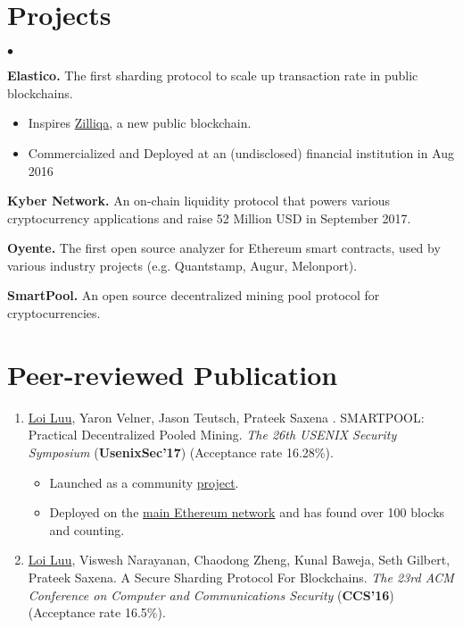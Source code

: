 \documentclass[margin,line]{res}
\newenvironment{list0}{
  \begin{list}{$\bullet$}{%
      \setlength{\itemsep}{0.08in}
      \setlength{\parsep}{0in} \setlength{\parskip}{0in}
      \setlength{\topsep}{0in} \setlength{\partopsep}{0in} 
      \setlength{\leftmargin}{0.0in}}}{\end{list}}
\begin{document}
\begin{resume}
\section{\sc Projects}
\begin{list0}
\item {\bf Elastico.} The first sharding protocol to scale up transaction rate in public blockchains.
  \begin{itemize}
    \item Inspires \href{https://zilliqa.com}{Zilliqa}, a new public blockchain.
    \item Commercialized and Deployed at an (undisclosed) financial institution in Aug 2016
  \end{itemize}

\item {\bf Kyber Network.} An on-chain liquidity protocol that powers various cryptocurrency applications and raise 52 Million USD in September 2017.
\item {\bf Oyente.} The first open source analyzer for Ethereum smart contracts, used by various industry projects (e.g. Quantstamp, Augur, Melonport).
\item {\bf SmartPool.} An open source decentralized mining pool protocol for cryptocurrencies.
\end{list0}



\section{\sc Peer-reviewed Publication}
\begin{enumerate}
  \item \underline{Loi Luu}, Yaron Velner, Jason Teutsch, Prateek Saxena . SMARTPOOL: Practical Decentralized Pooled Mining. \emph{The 26th USENIX Security Symposium} (\textbf{UsenixSec'17}) (Acceptance rate 16.28\%).
  \begin{itemize}
    \item Launched as a community \href{http://smartpool.io/}{project}.
    \item Deployed on the \href{https://etherscan.io/address/0xfc668AE14b0F7702c04b105448fE733D96C558DF}{main Ethereum network} and has found over 100 blocks and counting.
  \end{itemize}

  \item \underline{Loi Luu}, Viswesh Narayanan, Chaodong Zheng, Kunal Baweja, Seth Gilbert, Prateek Saxena. A Secure Sharding Protocol For Blockchains. \emph{The 23rd ACM Conference on Computer and Communications Security} (\textbf{CCS'16}) (Acceptance rate 16.5\%).


\end{enumerate}
\end{resume}
\end{document}
